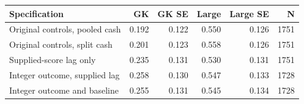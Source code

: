 \begin{tabular}{lrrrrr}
\toprule
Specification & GK & GK SE & Large & Large SE & N \\
\midrule
Original controls, pooled cash & 0.192 & 0.122 & 0.550 & 0.126 & 1751 \\
Original controls, split cash & 0.201 & 0.123 & 0.558 & 0.126 & 1751 \\
Supplied-score lag only & 0.235 & 0.131 & 0.530 & 0.131 & 1751 \\
Integer outcome, supplied lag & 0.258 & 0.130 & 0.547 & 0.133 & 1728 \\
Integer outcome and baseline & 0.255 & 0.131 & 0.545 & 0.134 & 1728 \\
\bottomrule
\end{tabular}
